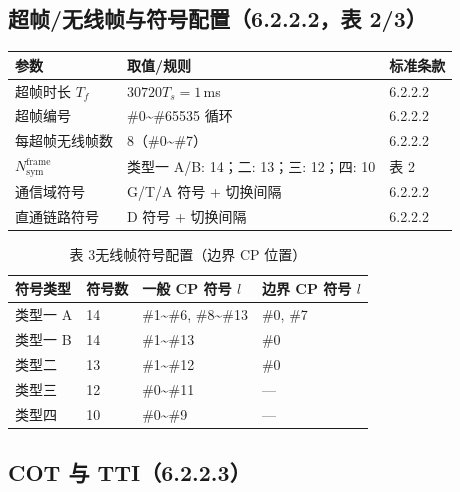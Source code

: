 \documentclass[11pt,a4paper]{ctexart}
\begin{document}
\subsection{超帧/无线帧与符号配置（6.2.2.2，表 2/3）}

\begin{table}[h]
\centering
\small
\begin{tabular}{lll}
\toprule
\textbf{参数} & \textbf{取值/规则} & \textbf{标准条款} \\
\midrule
超帧时长 $T_f$ & $30720 T_s = 1$\,ms & 6.2.2.2 \\
超帧编号 & \#0\textasciitilde\#65535 循环 & 6.2.2.2 \\
每超帧无线帧数 & 8（\#0\textasciitilde\#7） & 6.2.2.2 \\
$N_{\mathrm{sym}}^{\mathrm{frame}}$ & 类型一 A/B: 14；二: 13；三: 12；四: 10 & 表 2 \\
通信域符号 & G/T/A 符号 + 切换间隔 & 6.2.2.2 \\
直通链路符号 & D 符号 + 切换间隔 & 6.2.2.2 \\
\bottomrule
\end{tabular}
\end{table}

\begin{table}[h]
\centering
\caption{表 3\quad 无线帧符号配置（边界 CP 位置）}
\small
\begin{tabular}{llll}
\toprule
\textbf{符号类型} & \textbf{符号数} & \textbf{一般 CP 符号 $l$} & \textbf{边界 CP 符号 $l$} \\
\midrule
类型一 A & 14 & \#1\textasciitilde\#6, \#8\textasciitilde\#13 & \#0, \#7 \\
类型一 B & 14 & \#1\textasciitilde\#13 & \#0 \\
类型二 & 13 & \#1\textasciitilde\#12 & \#0 \\
类型三 & 12 & \#0\textasciitilde\#11 & --- \\
类型四 & 10 & \#0\textasciitilde\#9 & --- \\
\bottomrule
\end{tabular}
\end{table}

\subsection{COT 与 TTI（6.2.2.3）}
\end{document}
